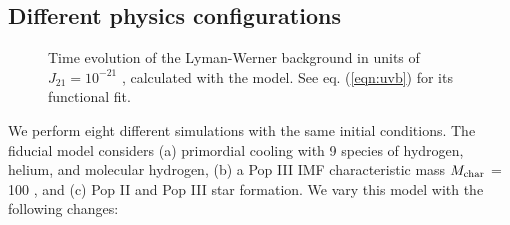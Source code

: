 \documentclass[useAMS,usenatbib]{mn2e}
\begin{document}
\subsection{Different physics configurations}
\label{sec:config}

\begin{figure}
  \caption{\label{fig:uvb} Time evolution of the Lyman-Werner
    background in units of $J_{21} = 10^{-21}$ \emis, calculated with
    the \citet{Wise05} model.  See eq. (\ref{eqn:uvb}) for its
    functional fit.}
\end{figure}

We perform eight different simulations with the same initial
conditions.  The fiducial model considers (a) primordial cooling with
9 species of hydrogen, helium, and molecular hydrogen, (b) a Pop III
IMF characteristic mass $M_{\rm char}$ = 100 \Ms, and (c) Pop II and
Pop III star formation.  We vary this model with the following
changes:
\end{document}
